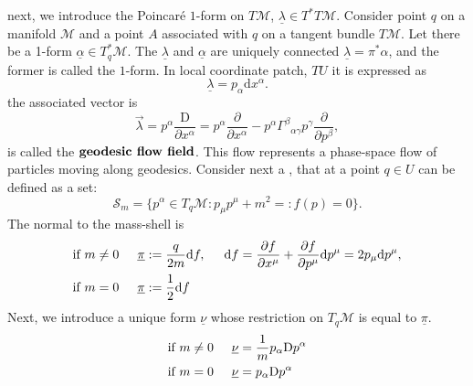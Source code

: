 next, we introduce the Poincar{\'e} $1$-form on $T\mathcal{M}$, $\underline{\lambda}\in T^* T\mathcal{M}$. 
Consider point $q$ on a manifold $\mathcal{M}$ and a point $A$ associated with $q$ on a tangent bundle $T\mathcal{M}$. 
Let there be a 1-form $\underline{\alpha}\in T^* _q\mathcal{M}$. 
The $\underline{\lambda}$ and $\underline{\alpha}$ are uniquely connected $\underline{\lambda} = \pi^* \alpha$, 
and the former is called the  $1$-form. In local coordinate patch, $TU$ it is expressed as
%
\begin{equation}
\underline{\lambda} = p_{\alpha} \text{d}x^{\alpha}.
\end{equation}
%
the associated vector is 
%
\begin{equation}
\vec{\lambda} = p^{\alpha} \frac{\text{D}}{\partial x^{\alpha}} = p^{\alpha}\frac{\partial}{\partial x^{\alpha}} - p^{\alpha}{\Gamma^{\beta}}_{\alpha\gamma}p^{\gamma}\frac{\partial}{\partial p^{\beta}},
\end{equation}
%
is called the $\textbf{geodesic flow field}$. 
This flow represents a phase-space flow of particles moving along geodesics. 
%
Consider next a , that at a point $q\in U$ can be defined as a set:
%
%
\begin{equation}
\mathcal{S}_m = \big\{ p^{\alpha}\in T_q\mathcal{M}: p_{\mu}p^{\mu}+m^2 =:f(p) = 0 \big\}.
\end{equation}
%
The normal to the mass-shell is 
%
\begin{align}
\text{if } m &\neq 0 \hspace{5mm} \underline{\pi}:=\frac{q}{2m}\text{d}f, \hspace{5mm} \text{d}f = \frac{\partial f}{\partial x^{\mu}} + \frac{\partial f}{\partial p^{\mu}}\text{d}p^{\mu} = 2p_{\mu}\text{d}p^{\mu}, \\
\text{if } m &= 0 \hspace{5mm} \underline{\pi}:=\frac{1}{2}\text{d}f
\end{align}
%
Next, we introduce a unique form $\underline{\nu}$ whose restriction on $T_q\mathcal{M}$ is equal to $\underline{\pi}$. 
%
\begin{equation*}
    \begin{aligned}
    \text{if } m &\neq 0 \hspace{5mm} \underline{\nu} = \frac{1}{m}p_{\alpha}\text{D}p^{\alpha} \\
    \text{if } m &= 0 \hspace{5mm} \underline{\nu} = p_{\alpha}\text{D}p^{\alpha}
    \end{aligned} 
\end{equation*}
